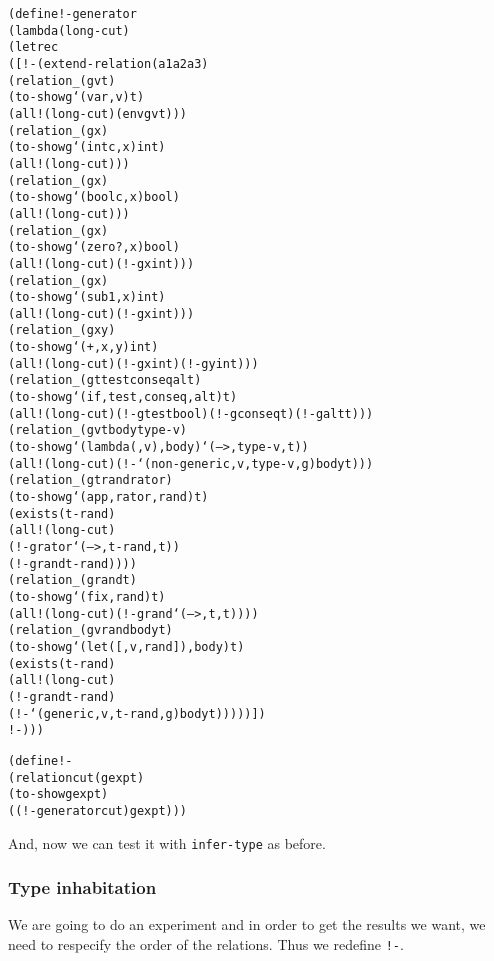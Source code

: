 \newpage
\begin{alltt}
(define !-generator
  (lambda (long-cut)
    (letrec
      ([!- (extend-relation (a1 a2 a3)
             (relation _ (g v t)
               (to-show g `(var ,v) t)
               (all! (long-cut) (env g v t)))
             (relation _ (g x)
               (to-show g `(intc ,x) int)
               (all! (long-cut)))
             (relation _ (g x)
               (to-show g `(boolc ,x) bool)
               (all! (long-cut)))
             (relation _ (g x)
               (to-show g `(zero? ,x) bool)
               (all! (long-cut) (!- g x int)))
             (relation _ (g x)
               (to-show g `(sub1 ,x) int)
               (all! (long-cut) (!- g x int)))
             (relation _ (g x y)
               (to-show g `(+ ,x ,y) int)
               (all! (long-cut) (!- g x int) (!- g y int)))
             (relation _ (g t test conseq alt)
               (to-show g `(if ,test ,conseq ,alt) t)
               (all! (long-cut) (!- g test bool) (!- g conseq t) (!- g alt t)))
             (relation _ (g v t body type-v)
               (to-show g `(lambda (,v) ,body) `(--> ,type-v ,t))
               (all! (long-cut) (!- `(non-generic ,v ,type-v ,g) body t)))
             (relation _ (g t rand rator)
               (to-show g `(app ,rator ,rand) t)
               (exists (t-rand)
                 (all! (long-cut)
                   (!- g rator `(--> ,t-rand ,t))
                   (!- g rand t-rand))))
             (relation _ (g rand t)
               (to-show g `(fix ,rand) t)
               (all! (long-cut) (!- g rand `(--> ,t ,t))))
             (relation _ (g v rand body t)
               (to-show g `(let ([,v ,rand]) ,body) t)
               (exists (t-rand)
                 (all! (long-cut)
                   (!- g rand t-rand)
                   (!- `(generic ,v ,t-rand ,g) body t)))))])
      !-)))
\end{alltt}
\newpage
\begin{alltt}
(define !-
  (relation cut (g exp t)
    (to-show g exp t)
    ((!-generator cut) g exp t)))
\end{alltt}

\noindent
And, now we can test it with \texttt{infer-type} as before.

\subsubsection{Type inhabitation}

We are going to do an experiment and in order to get the results
we want, we need to respecify the order of the relations.  Thus
we redefine \texttt{!-}.

